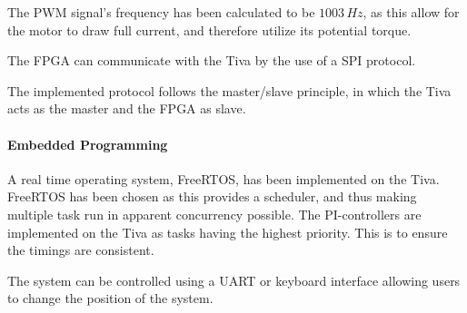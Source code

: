 \documentclass[../../main]{subfiles}
\begin{document}
The PWM signal's frequency has been calculated to be $1003 \si{\,Hz}$, as this allow for the motor to draw full current, and therefore utilize its potential torque.

The FPGA can communicate with the Tiva by the use of a SPI protocol.

The implemented protocol follows the master/slave principle, in which the Tiva acts as the master and the FPGA as slave.

\paragraph{Embedded Programming}
A real time operating system, FreeRTOS, has been implemented on the Tiva. FreeRTOS has been chosen as this provides a scheduler, and thus making multiple task run in apparent concurrency possible.
The PI-controllers are implemented on the Tiva as tasks having the highest priority. This is to ensure the timings are consistent.

The system can be controlled using a UART or keyboard interface allowing users to change the position of the system.
\end{document}
